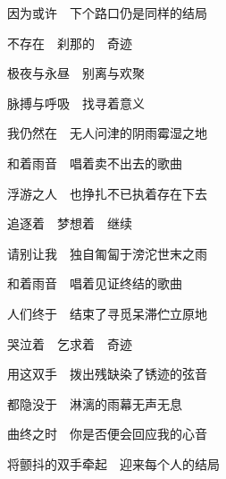 {因为或许　下个路口仍是同样的结局

不存在　刹那的　奇迹

\bigskip

极夜与永昼　别离与欢聚

脉搏与呼吸　找寻着意义

\bigskip

我仍然在　无人问津的阴雨霉湿之地

和着雨音　唱着卖不出去的歌曲

浮游之人　也挣扎不已执着存在下去

追逐着　梦想着　继续

\bigskip

请别让我　独自匍匐于滂沱世末之雨

和着雨音　唱着见证终结的歌曲

人们终于　结束了寻觅呆滞伫立原地

哭泣着　乞求着　奇迹

\bigskip

用这双手　拨出残缺染了锈迹的弦音

都隐没于　淋漓的雨幕无声无息

曲终之时　你是否便会回应我的心音

将颤抖的双手牵起　迎来每个人的结局

}

